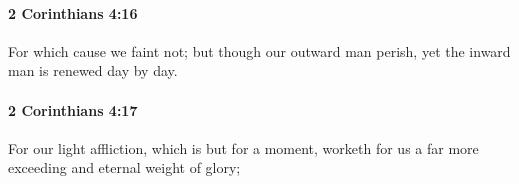 		\paragraph{2 Corinthians 4:16} %
			\label{2CORINTHIANS-4-16}

			For which cause we faint not; but though our outward man perish, yet the inward man is renewed day by day.

			\begin{framed}
			\scriptsize
				\begin{compactdesc}
					\item[SBLG] 
				\end{compactdesc}
			\end{framed}

		\paragraph{2 Corinthians 4:17} %
			\label{2CORINTHIANS-4-17}

			For our light affliction, which is but for a moment, worketh for us a far more exceeding and eternal weight of glory;

